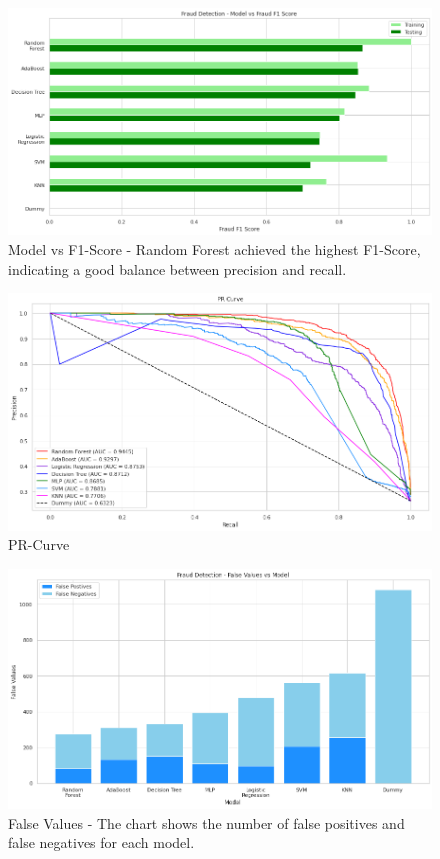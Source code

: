 \documentclass[10pt]{article}
\begin{document}
\begin{figure}[H]
	\centering
	\includegraphics[height = 0.40\textheight]{img/fraud_f1_score.png}
	\caption{Model vs F1-Score - Random Forest achieved the highest F1-Score, indicating a good balance between precision and recall.}
\end{figure}
\begin{figure}[H]
	\centering
	\includegraphics[height = 0.40\textheight]{img/PR_Curve.png}
	\caption{PR-Curve}
\end{figure}
\begin{figure}[H]
	\centering
	\includegraphics[height = 0.40\textheight]{img/fraud_detection_false_values.png}
	\caption{False Values - The chart shows the number of false positives and false negatives for each model.}
\end{figure}
\end{document}
